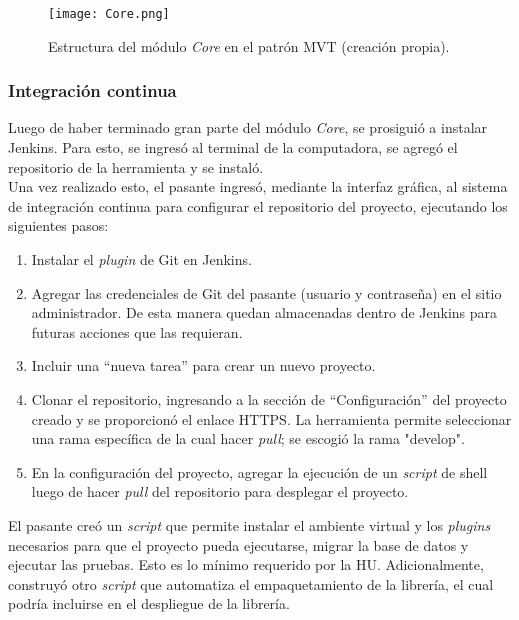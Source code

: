 \begin{figure}[h]
\centering
\texttt{[image: Core.png]}
\caption{Estructura del módulo \textit{Core} en el patrón MVT (creación propia).}
\label{fig:figura6.6}
\end{figure}

\subsubsection{Integración continua}

Luego de haber terminado gran parte del módulo \textit{Core}, se prosiguió a instalar Jenkins. Para esto, se ingresó al terminal de la computadora, se agregó el repositorio de la herramienta y se instaló.\\

Una vez realizado esto, el pasante ingresó, mediante la interfaz gráfica, al sistema de integración continua para configurar el repositorio del proyecto, ejecutando los siguientes pasos:

\begin{enumerate}
    \item Instalar el \textit{plugin} de Git en Jenkins.
    \item Agregar las credenciales de Git del pasante (usuario y contraseña) en el sitio administrador. De esta manera quedan almacenadas dentro de Jenkins para futuras acciones que las requieran.
    \item Incluir una “nueva tarea” para crear un nuevo proyecto.
    \item Clonar el repositorio, ingresando a la sección de  “Configuración” del proyecto creado y se proporcionó el enlace HTTPS. La herramienta permite seleccionar una rama específica de la cual hacer \textit{pull}; se escogió la rama "develop".
    \item En la configuración del proyecto, agregar la ejecución de un \textit{script} de shell luego de hacer \textit{pull} del repositorio para desplegar el proyecto.
\end{enumerate}

El pasante creó un \textit{script} que permite instalar el ambiente virtual y los \textit{plugins} necesarios para que el proyecto pueda ejecutarse, migrar la base de datos y ejecutar las pruebas. Esto es lo mínimo requerido por la HU. Adicionalmente, construyó otro \textit{script} que automatiza el empaquetamiento de la librería, el cual podría incluirse en el despliegue de la librería. \\

